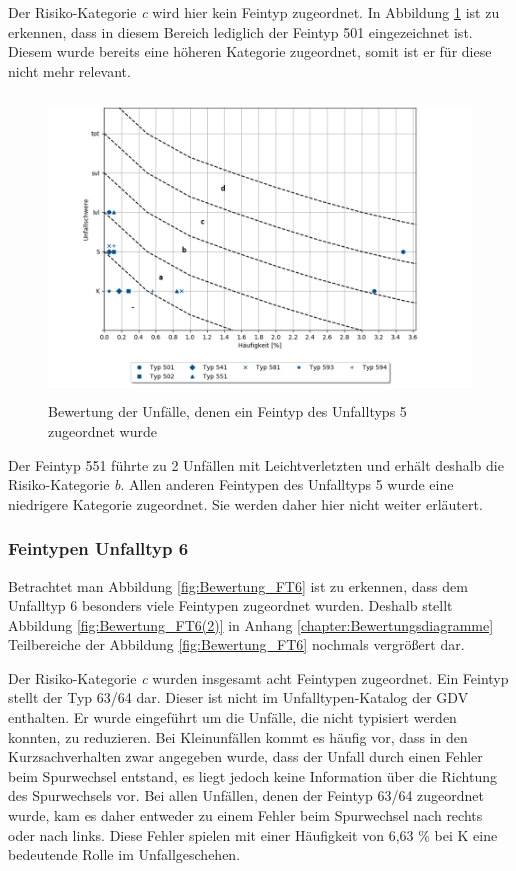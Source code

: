 Der Risiko-Kategorie \textit{c} wird hier kein Feintyp zugeordnet. In Abbildung \ref{fig:Bewertung_FT5} ist zu erkennen, dass in diesem Bereich lediglich der Feintyp 501 eingezeichnet ist. Diesem wurde bereits eine höheren Kategorie zugeordnet, somit ist er für diese nicht mehr relevant.

\begin{savenotes}
	\begin{figure}[H]
		\centering
		\includegraphics[width=12cm,height=8cm]{figures/Bewertung_FT5}
		\caption[Bewertung der Unfälle, denen ein Feintyp des Unfalltyps 5 zugeordnet wurde]{Bewertung der Unfälle, denen ein Feintyp des Unfalltyps 5 zugeordnet wurde}\label{fig:Bewertung_FT5}
	\end{figure}
\end{savenotes}

Der Feintyp 551 führte zu 2 Unfällen mit Leichtverletzten und erhält deshalb die Risiko-Kategorie \textit{b}. Allen anderen Feintypen des Unfalltyps 5 wurde eine niedrigere Kategorie zugeordnet. Sie werden daher hier nicht weiter erläutert.

\subsubsection{Feintypen Unfalltyp 6}
Betrachtet man Abbildung \ref{fig:Bewertung_FT6} ist zu erkennen, dass dem Unfalltyp 6 besonders viele Feintypen zugeordnet wurden. Deshalb stellt Abbildung \ref{fig:Bewertung_FT6(2)} in Anhang \ref{chapter:Bewertungsdiagramme} Teilbereiche der Abbildung \ref{fig:Bewertung_FT6} nochmals vergrößert dar.

Der Risiko-Kategorie \textit{c} wurden insgesamt acht Feintypen zugeordnet. Ein Feintyp stellt der Typ 63/64 dar. Dieser ist nicht im Unfalltypen-Katalog der GDV enthalten. Er wurde eingeführt um die Unfälle, die nicht typisiert werden konnten, zu reduzieren. Bei Kleinunfällen kommt es häufig vor, dass in den Kurzsachverhalten zwar angegeben wurde, dass der Unfall durch einen Fehler beim Spurwechsel entstand, es liegt jedoch keine Information über die Richtung des Spurwechsels vor. Bei allen Unfällen, denen der Feintyp 63/64 zugeordnet wurde, kam es daher entweder zu einem Fehler beim Spurwechsel nach rechts oder nach links. Diese Fehler spielen mit einer Häufigkeit von 6,63 \% bei \ac{K} eine bedeutende Rolle im Unfallgeschehen.

